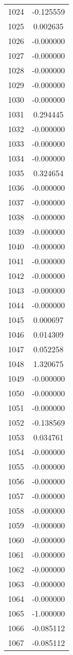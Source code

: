 \documentclass[12pt]{article}
\begin{document}
\begin{longtable}{@{}cc@{}}
1024 & -0.125559 \\
1025 & 0.002635 \\
1026 & -0.000000 \\
1027 & -0.000000 \\
1028 & -0.000000 \\
1029 & -0.000000 \\
1030 & -0.000000 \\
1031 & 0.294445 \\
1032 & -0.000000 \\
1033 & -0.000000 \\
1034 & -0.000000 \\
1035 & 0.324654 \\
1036 & -0.000000 \\
1037 & -0.000000 \\
1038 & -0.000000 \\
1039 & -0.000000 \\
1040 & -0.000000 \\
1041 & -0.000000 \\
1042 & -0.000000 \\
1043 & -0.000000 \\
1044 & -0.000000 \\
1045 & 0.000697 \\
1046 & 0.014309 \\
1047 & 0.052258 \\
1048 & 1.320675 \\
1049 & -0.000000 \\
1050 & -0.000000 \\
1051 & -0.000000 \\
1052 & -0.138569 \\
1053 & 0.034761 \\
1054 & -0.000000 \\
1055 & -0.000000 \\
1056 & -0.000000 \\
1057 & -0.000000 \\
1058 & -0.000000 \\
1059 & -0.000000 \\
1060 & -0.000000 \\
1061 & -0.000000 \\
1062 & -0.000000 \\
1063 & -0.000000 \\
1064 & -0.000000 \\
1065 & -1.000000 \\
1066 & -0.085112 \\
1067 & -0.085112 \\

\end{longtable}
\end{document}
